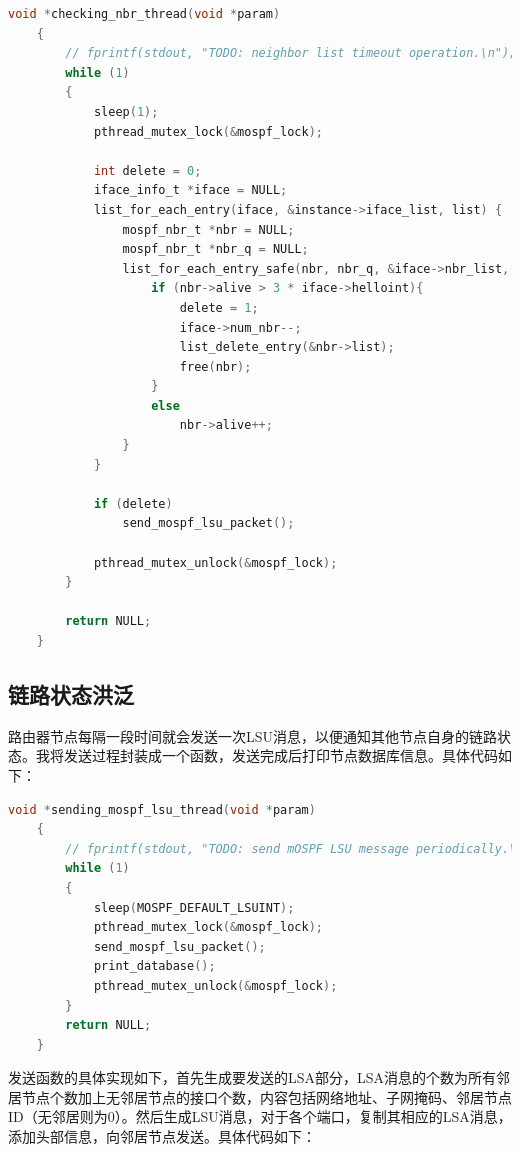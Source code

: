 \documentclass[UTF8]{report}
\begin{document}
\begin{lstlisting}[language=C]
    void *checking_nbr_thread(void *param)
    {
        // fprintf(stdout, "TODO: neighbor list timeout operation.\n");
        while (1)
        {
            sleep(1);
            pthread_mutex_lock(&mospf_lock);
    
            int delete = 0;
            iface_info_t *iface = NULL;
            list_for_each_entry(iface, &instance->iface_list, list) {
                mospf_nbr_t *nbr = NULL;
                mospf_nbr_t *nbr_q = NULL;
                list_for_each_entry_safe(nbr, nbr_q, &iface->nbr_list, list) {
                    if (nbr->alive > 3 * iface->helloint){
                        delete = 1;
                        iface->num_nbr--;
                        list_delete_entry(&nbr->list);
                        free(nbr);
                    }
                    else
                        nbr->alive++;
                }
            }
    
            if (delete)
                send_mospf_lsu_packet();
            
            pthread_mutex_unlock(&mospf_lock);
        }
        
        return NULL;
    }
\end{lstlisting}

\subsection{链路状态洪泛}

路由器节点每隔一段时间就会发送一次LSU消息，以便通知其他节点自身的链路状态。我将发送过程封装成一个函数，发送完成后打印节点数据库信息。具体代码如下：

\begin{lstlisting}[language=C]
    void *sending_mospf_lsu_thread(void *param)
    {
        // fprintf(stdout, "TODO: send mOSPF LSU message periodically.\n");
        while (1)
        {
            sleep(MOSPF_DEFAULT_LSUINT);
            pthread_mutex_lock(&mospf_lock);
            send_mospf_lsu_packet();
            print_database();
            pthread_mutex_unlock(&mospf_lock);
        }
        return NULL;
    }    
\end{lstlisting}

发送函数的具体实现如下，首先生成要发送的LSA部分，LSA消息的个数为所有邻居节点个数加上无邻居节点的接口个数，内容包括网络地址、子网掩码、邻居节点ID（无邻居则为0）。然后生成LSU消息，对于各个端口，复制其相应的LSA消息，添加头部信息，向邻居节点发送。具体代码如下：
\end{document}
